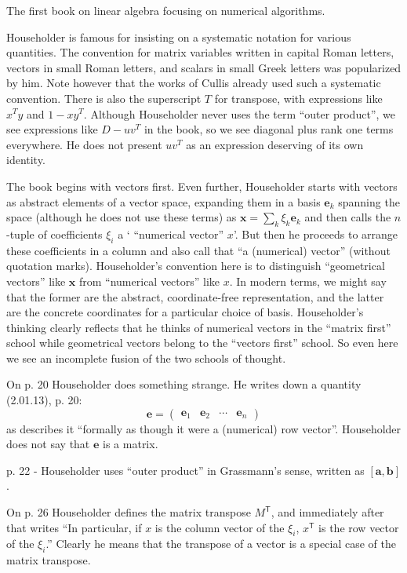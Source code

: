 The first book on linear algebra focusing on numerical algorithms.

Householder is famous for insisting on a systematic notation for various
quantities.  The convention for matrix variables written in capital Roman
letters, vectors in small Roman letters, and scalars in small Greek letters was
popularized by him. Note however that the works of Cullis already used such a
systematic convention.
There is also the superscript $T$ for transpose, with expressions like $x^T y$
and $1 - x y^T$.  Although Householder never uses the term ``outer product'',
we see expressions like $D - u v^T$ in the book, so we see diagonal plus rank
one terms everywhere. He does not present $u v^T$ as an expression deserving of
its own identity.

The book begins with vectors first. Even further, Householder starts with
vectors as abstract elements of a vector space, expanding them in a basis
$\mathbf e_k$ spanning the space (although he does not use these terms) as
$\mathbf x = \sum_k \xi_k \mathbf e_k$ and then calls the $n$-tuple of
coefficients $\xi_i$ a ` ``numerical vector'' $x$'. But then he proceeds to
arrange these coefficients in a column and also call that ``a (numerical)
vector'' (without quotation marks).
Householder's convention here is to distinguish  ``geometrical vectors'' like
$\mathbf x$ from ``numerical vectors'' like $x$. In modern terms, we might say
that the former are the abstract, coordinate-free representation, and the
latter are the concrete coordinates for a particular choice of basis.
Householder's thinking clearly reflects that he thinks of numerical vectors in
the ``matrix first'' school while geometrical vectors belong to the ``vectors
first'' school. So even here we see an incomplete fusion of the two schools of
thought.

On p. 20 Householder does something strange. He writes down a quantity (2.01.13), p. 20:
\[
\mathbf e = \begin{pmatrix}\mathbf e_1 & \mathbf e_2 & \cdots & \mathbf e_n\end{pmatrix}
\]
as describes it ``formally as though it were a (numerical) row vector''.
Householder does not say that $\mathbf e$ is a matrix.

p. 22 - Householder uses ``outer product'' in Grassmann's sense, written as
$[\mathbf a, \mathbf b]$.

On p. 26 Householder defines the matrix transpose $M^{\mathsf T}$, and immediately
after that writes ``In particular, if $x$ is the column vector of the $\xi_i$,
$x^{\mathsf T}$ is the row vector of the $\xi_i$.'' Clearly he means that the
transpose of a vector is a special case of the matrix transpose.

